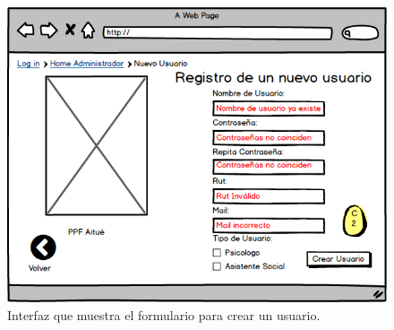 \begin{figure}[h!]
	\label{newuseralt}
	\begin{center}
		\includegraphics[scale=0.3]{imagenes/newuseralt.png}
	\end{center}
	\caption{Interfaz que muestra el formulario para crear un usuario.}
\end{figure}

